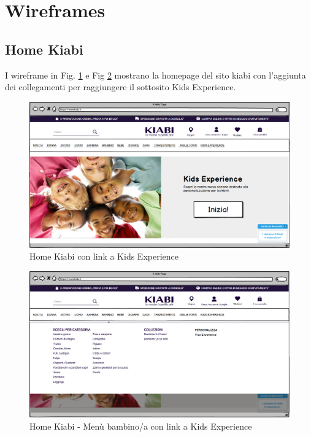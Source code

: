 \documentclass[12pt,italian,]{report}
\begin{document}
\section{Wireframes}\label{Wireframes}

\subsection{Home Kiabi}

I wireframe in Fig. \ref{kiabi_home} e Fig \ref{kiabi_home_selection} mostrano la homepage del sito kiabi con l'aggiunta dei collegamenti per raggiungere il sottosito Kids Experience.

\begin{figure}[h]
\centering
\includegraphics{balsamiq/Kiabi Home.png}
\caption{Home Kiabi con link a Kids Experience}
\label{kiabi_home}
\end{figure}

\begin{figure}[h]
\centering
\includegraphics{balsamiq/Kiabi Scelta.png}
\caption{Home Kiabi - Menù bambino/a con link a Kids Experience}
\label{kiabi_home_selection}
\end{figure}
\end{document}
